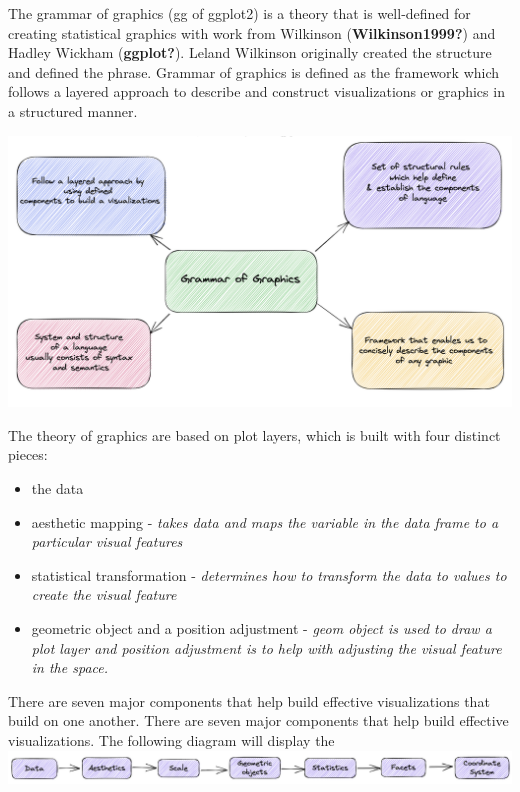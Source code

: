 \documentclass[print]{nuthesis}
\providecommand{\tightlist}{%
  \setlength{\itemsep}{0pt}\setlength{\parskip}{0pt}}
\begin{document}
The grammar of graphics (gg of ggplot2) is a theory that is well-defined for creating statistical graphics with work from Wilkinson (\textbf{Wilkinson1999?}) and Hadley Wickham (\textbf{ggplot?}). Leland Wilkinson originally created the structure and defined the phrase. Grammar of graphics is defined as the framework which follows a layered approach to describe and construct visualizations or graphics in a structured manner.

\includegraphics[width=\textwidth]{figure/ggDiagram}

The theory of graphics are based on plot layers, which is built with four distinct pieces:

\begin{itemize}
\tightlist
\item
  the data
\item
  aesthetic mapping - \emph{takes data and maps the variable in the data frame to a particular visual features}
\item
  statistical transformation - \emph{determines how to transform the data to values to create the visual feature}
\item
  geometric object and a position adjustment - \emph{geom object is used to draw a plot layer and position adjustment is to help with adjusting the visual feature in the space.}
\end{itemize}

There are seven major components that help build effective visualizations that build on one another. There are seven major components that help build effective visualizations. The following diagram will display the
\includegraphics[width=\textwidth]{figure/EffectiveDataGraphics}
\end{document}
